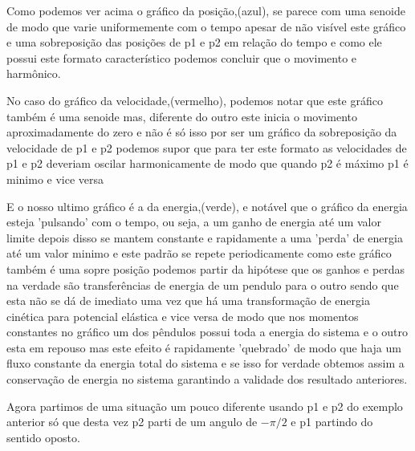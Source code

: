 \documentclass[a4paper]{article} %
\begin{document}
Como podemos ver acima o gráfico da posição,(azul), se parece com uma senoide de modo que varie uniformemente com o tempo apesar de não visível este gráfico e uma sobreposição das posições de p1 e p2 em relação do tempo e como ele possui este formato característico podemos concluir que o movimento e harmônico.

No caso do gráfico da velocidade,(vermelho), podemos notar que este gráfico também é uma senoide mas, diferente do outro este inicia o movimento aproximadamente do zero e não é só isso por ser um gráfico da sobreposição da velocidade de p1 e p2 podemos supor que para ter este formato as velocidades de p1 e p2 deveriam oscilar harmonicamente de modo que quando p2 é máximo p1 é minimo e vice versa

E o nosso ultimo gráfico é a da energia,(verde), e notável que o gráfico da energia esteja 'pulsando' com o tempo, ou seja, a um ganho de energia até um valor limite depois disso se mantem constante e rapidamente a uma 'perda' de energia até um valor minimo e este padrão se repete periodicamente como este gráfico também é uma sopre posição podemos partir da hipótese que os ganhos e perdas na verdade são transferências de energia de um pendulo para o outro sendo que esta não se dá de imediato uma vez que há uma transformação de energia cinética para potencial elástica e vice versa de modo que nos momentos constantes no gráfico um dos pêndulos possui toda a energia do sistema e o outro esta em repouso mas este efeito é rapidamente 'quebrado' de modo que haja um fluxo constante da energia total do sistema e se isso for verdade obtemos assim a conservação de energia no  sistema garantindo a validade dos resultado  anteriores. 

Agora partimos de uma situação um pouco diferente usando p1 e p2 do exemplo anterior só que desta vez p2 parti de um angulo de $-\pi/2$ e p1 partindo do sentido oposto.
\vspace{1cm}
\end{document}
